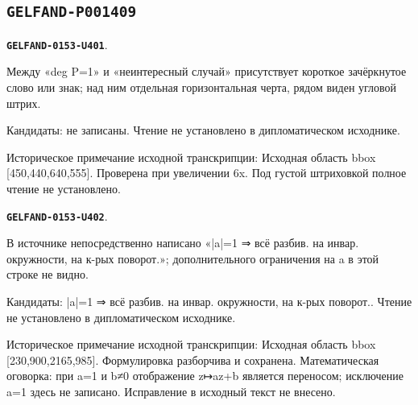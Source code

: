 \documentclass[11pt]{article}
\theoremstyle{definition}
\theoremstyle{remark}
\begin{document}
\subsection*{\texttt{GELFAND-P001409}}
\par\noindent\leavevmode{}\label{GELFAND-0153-U401}\label{GELFAND-P001409:degree-one-cancellation:note}\textbf{\texttt{GELFAND-0153-U401}}.\nopagebreak[4]\par
Между «deg P=1» и «неинтересный случай» присутствует короткое зачёркнутое слово или знак; над ним отдельная горизонтальная черта, рядом виден угловой штрих.\par
Кандидаты: не записаны. Чтение не установлено в дипломатическом исходнике.\par
Историческое примечание исходной транскрипции: Исходная область bbox [450,440,640,555]. Проверена при увеличении 6x. Под густой штриховкой полное чтение не установлено.\par\medskip
\par\noindent\leavevmode{}\label{GELFAND-0153-U402}\label{GELFAND-P001409:unit-modulus-claim:note}\textbf{\texttt{GELFAND-0153-U402}}.\nopagebreak[4]\par
В источнике непосредственно написано «|a|=1 ⇒ всё разбив. на инвар. окружности, на к-рых поворот.»; дополнительного ограничения на a в этой строке не видно.\par
Кандидаты: |a|=1 ⇒ всё разбив. на инвар. окружности, на к-рых поворот.. Чтение не установлено в дипломатическом исходнике.\par
Историческое примечание исходной транскрипции: Исходная область bbox [230,900,2165,985]. Формулировка разборчива и сохранена. Математическая оговорка: при a=1 и b≠0 отображение z↦az+b является переносом; исключение a=1 здесь не записано. Исправление в исходный текст не внесено.\par\medskip
\end{document}
